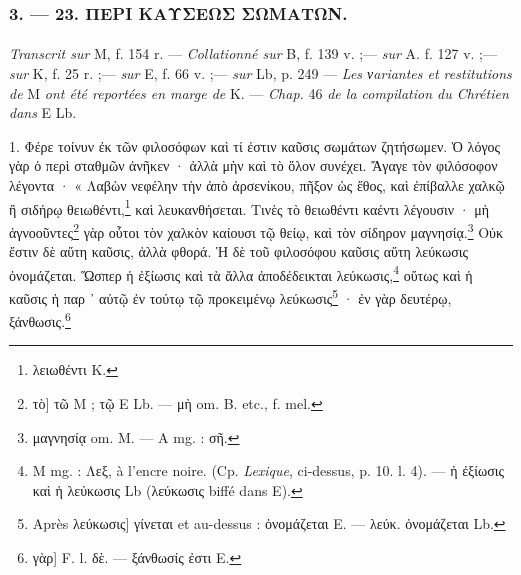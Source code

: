 \documentclass[a4paper, 11pt, oneside, polutonikogreek, french]{article}
\begin{document}
\bigskip
\centerline{\EightStarTaper}
\centerline{\EightStarTaper\EightStarTaper}
\bigskip

\subsubsection{3. --- 23. ΠΕΡΙ ΚΑΥΣΕΩΣ ΣΩΜΑΤΩΝ.}
\paragraph{}
\emph{Transcrit sur} M, f. 154 r. --- \emph{Collationné sur} B, f. 139 v. ;--- \emph{sur} A. f. 127 v. ;--- \emph{sur} K, f. 25 r. ;--- \emph{sur} E, f. 66 v. ;--- \emph{sur} Lb, p. 249 --- \emph{Les νariantes et restitutions de} M \emph{ont été reportées en marge de} K. --- \emph{Chap.} 46 \emph{de la compilation du Chrétien dans} E Lb.

\bigskip

1. Φέρε τοίνυν ἐκ τῶν φιλοσόφων καὶ τί ἐστιν καῦσις σωμάτων ζητήσωμεν. Ὁ λόγος γὰρ ὁ περὶ σταθμῶν ἀνῆκεν · ἀλλὰ μὴν καὶ τὸ ὅλον συνέχει. Ἄγαγε τὸν φιλόσοφον λέγοντα · « Λαβὼν νεφέλην τὴν ἀπὸ ἀρσενίκου, πῆξον ὡς ἔθος, καὶ ἐπίβαλλε χαλκῷ ἢ σιδήρῳ θειωθέντι,\footnote{λειωθέντι K.} καὶ λευκανθήσεται. Τινὲς τὸ θειωθέντι καέντι λέγουσιν · μὴ ἀγνοοῦντες\footnote{τὸ] τῶ M ; τῷ E Lb. --- μὴ om. B. etc., f. mel.} γὰρ οὗτοι τὸν χαλκὸν καίουσι τῷ θείῳ, καὶ τὸν σίδηρον μαγνησίᾳ.\footnote{μαγνησίᾳ om. M. --- A mg. : σῆ.} Οὐκ ἔστιν δὲ αὕτη καῦσις, ἀλλὰ φθορά. Ἡ δὲ τοῦ φιλοσόφου καῦσις αὕτη λεύκωσις ὀνομάζεται. Ὥσπερ ἡ ἐξίωσις καὶ τὰ ἄλλα ἀποδέδεικται λεύκωσις,\footnote{M mg. : Λεξ, à l'encre noire. (Cp. \emph{Lexique}, ci-dessus, p. 10. l. 4). --- ἡ ἐξίωσις καὶ ἡ λεύκωσις Lb (λεύκωσις biffé dans E).} οὕτως καὶ ἡ καῦσις ἡ παρ ᾽ αὐτῷ ἐν τούτῳ τῷ προκειμένῳ λεύκωσις\footnote{Après λεύκωσις] γίνεται et au-dessus : ὀνομάζεται E. --- λεύκ. ὀνομάζεται Lb.} · ἐν γὰρ δευτέρῳ, ξάνθωσις.\footnote{γὰρ] F. l. δὲ. --- ξάνθωσίς ἐστι E.}
\end{document}
